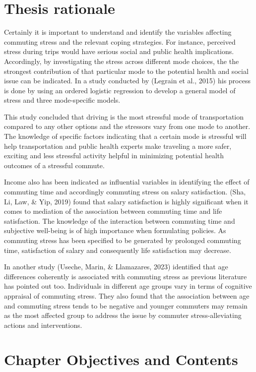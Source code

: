 \documentclass[
11pt, %
oneside, %
english, %
singlespacing, %
]{macthesis} %
\begin{document}
\hypertarget{thesis-rationale}{%
\section{Thesis rationale}\label{thesis-rationale}}

Certainly it is important to understand and identify the variables affecting commuting stress and the relevant coping strategies. For instance, perceived stress during trips would have serious social and public health implications. Accordingly, by investigating the stress across different mode choices, the the strongest contribution of that particular mode to the potential health and social issue can be indicated. In a study conducted by (Legrain et al., 2015) his process is done by using an ordered logistic regression to develop a general model of stress and three mode-specific models.

This study concluded that driving is the most stressful mode of transportation compared to any other options and the stressors vary from one mode to another. The knowledge of specific factors indicating that a certain mode is stressful will help transportation and public health experts make traveling a more safer, exciting and less stressful activity helpful in minimizing potential health outcomes of a stressful commute.

Income also has been indicated as influential variables in identifying the effect of commuting time and accordingly commuting stress on salary satisfaction. (Sha, Li, Law, \& Yip, 2019) found that salary satisfaction is highly significant when it comes to mediation of the association between commuting time and life satisfaction. The knowledge of the interaction between commuting time and subjective well-being is of high importance when formulating policies. As commuting stress has been specified to be generated by prolonged commuting time, satisfaction of salary and consequently life satisfaction may decrease.

In another study (Useche, Marin, \& Llamazares, 2023) identified that age differences coherently is associated with commuting stress as previous literature has pointed out too. Individuals in different age groups vary in terms of cognitive appraisal of commuting stress. They also found that the association between age and commuting stress tends to be negative and younger commuters may remain as the most affected group to address the issue by commuter stress-alleviating actions and interventions.

\hypertarget{chapter-objectives-and-contents}{%
\section{Chapter Objectives and Contents}\label{chapter-objectives-and-contents}}
\end{document}
